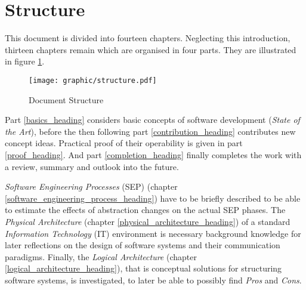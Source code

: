 %
%
%
%
%
%
%

\section{Structure}
\label{structure_heading}

This document is divided into fourteen chapters. Neglecting this introduction,
thirteen chapters remain which are organised in four parts. They are illustrated
in figure \ref{structure_figure}.

\begin{figure}[ht]
    \begin{center}
        \texttt{[image: graphic/structure.pdf]}
        \caption{Document Structure}
        \label{structure_figure}
    \end{center}
\end{figure}

Part \ref{basics_heading} considers basic concepts of software development
(\emph{State of the Art}), before the then following part \ref{contribution_heading}
contributes new concept ideas. Practical proof of their operability is given in
part \ref{proof_heading}. And part \ref{completion_heading} finally completes
the work with a review, summary and outlook into the future.

\emph{Software Engineering Processes} (SEP) (chapter
\ref{software_engineering_process_heading}) have to be briefly described to be
able to estimate the effects of abstraction changes on the actual SEP phases.
The \emph{Physical Architecture} (chapter \ref{physical_architecture_heading})
of a standard \emph{Information Technology} (IT) environment is necessary
background knowledge for later reflections on the design of software systems
and their communication paradigms. Finally, the \emph{Logical Architecture}
(chapter \ref{logical_architecture_heading}), that is conceptual solutions for
structuring software systems, is investigated, to later be able to possibly
find \emph{Pros} and \emph{Cons}.

